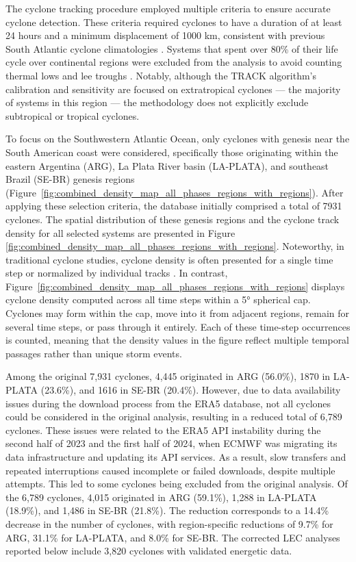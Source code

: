 \documentclass[pdflatex,sn-chicago]{sn-jnl}%
\theoremstyle{plain}
\theoremstyle{definition}
\theoremstyle{remark}
\theoremstyle{definition}
\begin{document}
The cyclone tracking procedure employed multiple criteria to ensure accurate cyclone detection. These criteria required cyclones to have a duration of at least 24 hours and a minimum displacement of 1000 km, consistent with previous South Atlantic cyclone climatologies \citep{sinclair1995climatology,gramcianinov2019properties}. Systems that spent over 80\% of their life cycle over continental regions were excluded from the analysis to avoid counting thermal lows and lee troughs \citep[e.g.][]{crespo2021potential}. Notably, although the TRACK algorithm's calibration and sensitivity are focused on extratropical cyclones — the majority of systems in this region \citep{marrafon2022classificaccao} — the methodology does not explicitly exclude subtropical or tropical cyclones.  

To focus on the Southwestern Atlantic Ocean, only cyclones with genesis near the South American coast were considered, specifically those originating within the eastern Argentina (ARG), La Plata River basin (LA-PLATA), and southeast Brazil (SE-BR) genesis regions \citep{gramcianinov2019properties,couto2024new} (Figure~\ref{fig:combined_density_map_all_phases_regions_with_regions}). After applying these selection criteria, the database initially comprised a total of 7931 cyclones. The spatial distribution of these genesis regions and the cyclone track density for all selected systems are presented in Figure \ref{fig:combined_density_map_all_phases_regions_with_regions}. Noteworthy, in traditional cyclone studies, cyclone density is often presented for a single time step or normalized by individual tracks \citep[e.g.,][]{hoskins2005new,gramcianinov2019properties}. In contrast, Figure~\ref{fig:combined_density_map_all_phases_regions_with_regions} displays cyclone density computed across all time steps within a 5° spherical cap. Cyclones may form within the cap, move into it from adjacent regions, remain for several time steps, or pass through it entirely. Each of these time-step occurrences is counted, meaning that the density values in the figure reflect multiple temporal passages rather than unique storm events.

Among the original 7,931 cyclones, 4,445 originated in ARG (56.0\%), 1870 in LA-PLATA (23.6\%), and 1616 in SE-BR (20.4\%). However, due to data availability issues during the download process from the ERA5 database, not all cyclones could be considered in the original analysis, resulting in a reduced total of 6,789 cyclones. These issues were related to the ERA5 API instability during the second half of 2023 and the first half of 2024, when ECMWF was migrating its data infrastructure and updating its API services. As a result, slow transfers and repeated interruptions caused incomplete or failed downloads, despite multiple attempts. This led to some cyclones being excluded from the original analysis. Of the 6,789 cyclones, 4,015 originated in ARG (59.1\%), 1,288 in LA-PLATA (18.9\%), and 1,486 in SE-BR (21.8\%). The reduction corresponds to a 14.4\% decrease in the number of cyclones, with region-specific reductions of 9.7\% for ARG, 31.1\% for LA-PLATA, and 8.0\% for SE-BR. The corrected LEC analyses reported below include 3,820 cyclones with validated energetic data.
\end{document}
